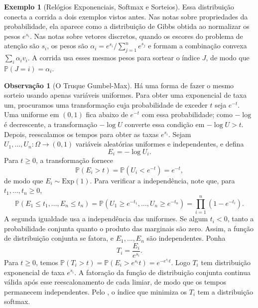 \documentclass[12pt,portuguese]{article}
\theoremstyle{definition}
\newtheorem{example}[example]{Exemplo}
\newtheorem{remark}[remark]{Observação}
\theoremstyle{plainexercise}
\theoremstyle{starredexercise}
\theoremstyle{definition}
\begin{document}
\begin{example}[Relógios Exponenciais, Softmax e Sorteios]
Essa distribuição conecta a corrida a dois exemplos vistos antes. Nas notas
sobre propriedades da probabilidade, ela aparece como a distribuição de Gibbs
obtida ao normalizar os pesos $e^{s_i}$. Nas notas sobre vetores discretos,
quando os escores do problema de atenção são $s_i$, os pesos são
$\alpha_i=e^{s_i}/\sum_{j=1}^n e^{s_j}$ e formam a combinação convexa
$\sum_i\alpha_i v_i$. A corrida usa esses mesmos pesos para sortear o índice
$J$, de modo que $\mathbb{P}(J=i)=\alpha_i$.
\end{example}

\begin{remark}[O Truque Gumbel-Max]\label{rem:gumbel-max}
Há uma forma de fazer o mesmo sorteio usando apenas variáveis uniformes.
Para obter uma exponencial de taxa um, procuramos uma transformação cuja
probabilidade de exceder $t$ seja $e^{-t}$. Uma uniforme em $(0,1)$ fica
abaixo de $e^{-t}$ com essa probabilidade; como $-\log$ é decrescente, a
transformação $-\log U$ converte essa condição em $-\log U>t$.
Depois, reescalamos os tempos para obter as taxas $e^{s_i}$. Sejam
$U_1,\ldots,U_n:\Omega\to(0,1)$ variáveis aleatórias uniformes e
independentes, e defina
\[
  E_i=-\log U_i.
\]
Para $t\geqslant0$, a transformação fornece
\[
  \mathbb{P}(E_i>t)
  =\mathbb{P}(U_i<e^{-t})=e^{-t},
\]
de modo que $E_i\sim\mathrm{Exp}(1)$. Para verificar a independência, note
que, para $t_1,\ldots,t_n\geqslant0$,
\[
  \mathbb{P}(E_1\leqslant t_1,\ldots,E_n\leqslant t_n)
  =\mathbb{P}(U_1\geqslant e^{-t_1},\ldots,U_n\geqslant e^{-t_n})
  =\prod_{i=1}^n(1-e^{-t_i}).
\]
A segunda igualdade usa a independência das uniformes. Se algum $t_i<0$,
tanto a probabilidade conjunta quanto o produto das marginais são zero.
Assim, a função de distribuição conjunta se fatora, e $E_1,\ldots,E_n$
são independentes. Ponha
\[
  T_i=\frac{E_i}{e^{s_i}}.
\]
Para $t\geqslant0$, temos
$\mathbb{P}(T_i>t)=\mathbb{P}(E_i>e^{s_i}t)=e^{-e^{s_i}t}$.
Logo $T_i$ tem distribuição exponencial de taxa $e^{s_i}$. A fatoração
da função de distribuição conjunta continua válida após esse
reescalonamento de cada limiar, de modo que os tempos permanecem
independentes. Pelo , o índice que
minimiza os $T_i$ tem a distribuição softmax.


\end{remark}
\end{document}
